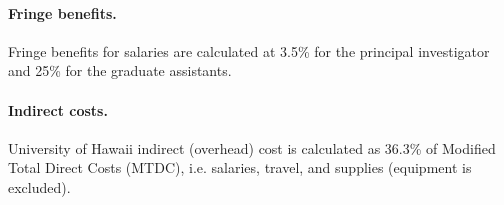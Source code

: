 \paragraph*{Fringe benefits.} 
Fringe benefits for salaries are calculated at 3.5\% for the principal
investigator and 25\% for the graduate assistants.

\paragraph*{Indirect costs.}  
University of Hawaii indirect (overhead) cost is calculated as 36.3\% of Modified Total
Direct Costs (MTDC), i.e. salaries, travel, and supplies (equipment is
excluded).








